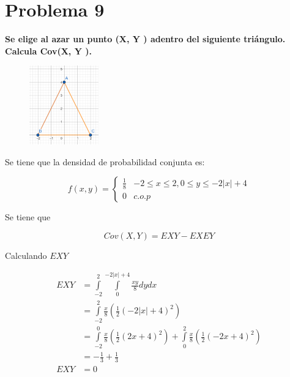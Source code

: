 \section*{Problema 9}

\textbf{Se elige al azar un punto (X, Y ) adentro del siguiente triángulo. Calcula Cov(X, Y ).}

\begin{figure}[H]
    \centering
    \includegraphics[width=3cm]{Graphics/problem9_image.png}
\end{figure}

Se tiene que la densidad de probabilidad conjunta es:

\begin{equation*}
    f(x,y) = \begin{cases}
        \frac{1}{8} & -2\leq x \leq 2 , 0\leq y \leq -2|x|+4 \\
        0           & c.o.p
    \end{cases}
\end{equation*}

Se tiene que

\begin{equation*}
    Cov(X,Y) = EXY -EX EY
\end{equation*}

Calculando $EXY$

\begin{align*}
    EXY & = \int\limits_{-2}^2 \int\limits_{0}^{-2|x|+4} \frac{xy}{8}dydx                                                                       \\
        & = \int\limits_{-2}^2 \frac{x}{8}\left (\frac{1}{2}(-2|x|+4)^2\right )                                                                 \\
        & = \int\limits_{-2}^0 \frac{x}{8}\left (\frac{1}{2}(2x+4)^2\right ) + \int\limits_{0}^2 \frac{x}{8}\left (\frac{1}{2}(-2x+4)^2\right ) \\
        & = -\frac{1}{3} + \frac{1}{3}                                                                                                          \\
    EXY & = 0
\end{align*}

